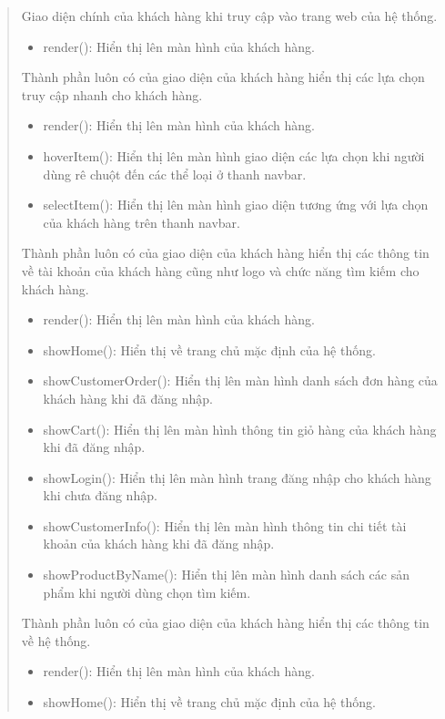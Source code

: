 \begin{quote}
	
	 	Giao diện chính của khách hàng khi truy cập vào trang web của hệ thống.
		\begin{itemize}
			\item render(): Hiển thị lên màn hình của khách hàng.
		\end{itemize}
		Thành phần luôn có của giao diện của khách hàng hiển thị các lựa chọn truy cập nhanh cho khách hàng.
		\begin{itemize}
			\item render(): Hiển thị lên màn hình của khách hàng.
			\item hoverItem(): Hiển thị lên màn hình giao diện các lựa chọn khi người dùng rê chuột đến các thể loại ở thanh navbar.
			\item selectItem(): Hiển thị lên màn hình giao diện tương ứng với lựa chọn của khách hàng trên thanh navbar.
		\end{itemize}
		Thành phần luôn có của giao diện của khách hàng hiển thị các thông tin về tài khoản của khách hàng cũng như logo và chức năng tìm kiếm cho khách hàng.
		\begin{itemize}
			\item render(): Hiển thị lên màn hình của khách hàng.
			\item showHome(): Hiển thị về trang chủ mặc định của hệ thống.
			\item showCustomerOrder(): Hiển thị lên màn hình danh sách đơn hàng của khách hàng khi đã đăng nhập.
			\item showCart(): Hiển thị lên màn hình thông tin giỏ hàng của khách hàng khi đã đăng nhập.
			\item showLogin(): Hiển thị lên màn hình trang đăng nhập cho khách hàng khi chưa đăng nhập.
			\item showCustomerInfo(): Hiển thị lên màn hình thông tin chi tiết tài khoản của khách hàng khi đã đăng nhập.
			\item showProductByName(): Hiển thị lên màn hình danh sách các sản phẩm khi người dùng chọn tìm kiếm.
		\end{itemize}
		Thành phần luôn có của giao diện của khách hàng hiển thị các thông tin về hệ thống.
		\begin{itemize}
			\item render(): Hiển thị lên màn hình của khách hàng.
			\item showHome(): Hiển thị về trang chủ mặc định của hệ thống.

\end{itemize}
\end{quote}
